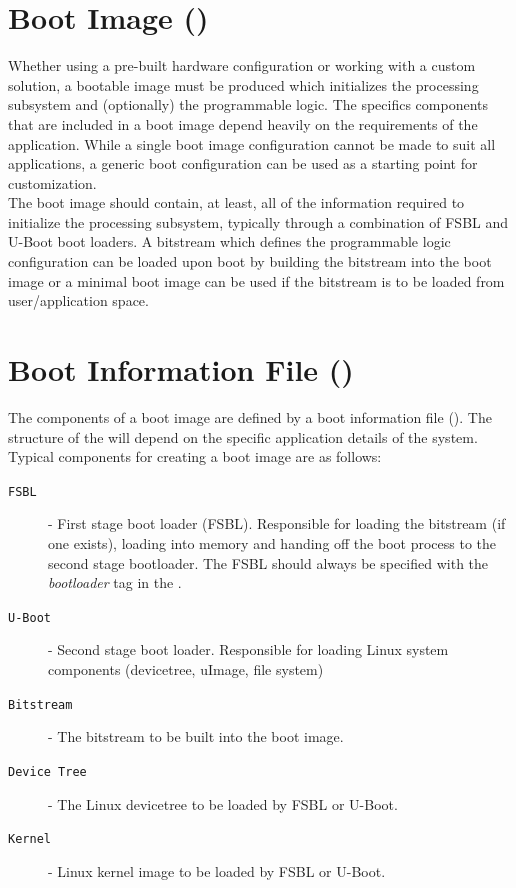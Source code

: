 \section{Boot Image ()}
\label{ch:inithardwaresys}

Whether using a pre-built hardware configuration or working with a custom solution, a bootable image must be produced which initializes the processing subsystem and (optionally) the programmable logic. The specifics components that are included in a boot image depend heavily on the requirements of the application. While a single boot image configuration cannot be made to suit all applications, a generic boot configuration can be used as a starting point for customization. \\


The boot image should contain, at least, all of the information required to initialize the processing subsystem, typically through a combination of FSBL and U-Boot boot loaders. A bitstream which defines the programmable logic configuration can be loaded upon boot by building the bitstream into the boot image or a minimal boot image can be used if the bitstream is to be loaded from user/application space. 


\section{Boot Information File ()}

The components of a boot image are defined by a boot information file (). The structure of the  will depend on the specific application details of the system. Typical components for creating a boot image are as follows:


\begin{description}
	\item[\texttt{FSBL}] - First stage boot loader (FSBL). Responsible for loading the bitstream (if one exists), loading into memory and handing off the boot process to the second stage bootloader. The FSBL should always be specified with the \textit{bootloader} tag in the .
	\item[\texttt{U-Boot}] - Second stage boot loader. Responsible for loading Linux system components (devicetree, uImage, file system)
	\item[\texttt{Bitstream}] - The bitstream to be built into the boot image.
	\item[\texttt{Device Tree}] - The Linux devicetree to be loaded by FSBL or U-Boot.
	\item[\texttt{Kernel}] - Linux kernel image to be loaded by FSBL or U-Boot.
\end{description}




